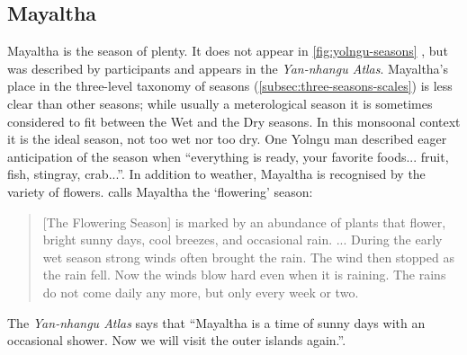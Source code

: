 \subsection{Mayaltha}


Mayaltha is the season of plenty.  It does not appear in
\cref{fig:yolngu-seasons} \citep{davis1989}, but was described by
participants and appears in the \textit{Yan-nhangu Atlas}.  Mayaltha's
place in the three-level taxonomy of seasons (\cref{subsec:three-seasons-scales})
is less clear than other seasons; while usually a meterological season
it is sometimes considered to fit between the Wet and the Dry seasons.
%
In this monsoonal context it is the ideal season, not too wet nor too dry.
One Yolngu man described eager anticipation of the season
when ``everything is ready, your favorite foods...  fruit, fish, stingray,
crab...''.  In addition to weather, Mayaltha is recognised by the variety
of flowers.
%
\citet{davis1989} calls Mayaltha the `flowering' season:
\begin{quote}
    [The Flowering Season] is marked by an abundance of plants that
    flower, bright sunny days, cool breezes, and occasional rain. ...
    During the early wet season strong winds often brought the rain.
    The wind then stopped as the rain fell.  Now the winds blow hard
    even when it is raining.  The rains do not come daily any more,
    but only every week or two.
\end{quote}

The \textit{Yan-nhangu Atlas} says that ``Mayaltha is a time of sunny days
with an occasional shower.  Now we will visit the outer islands again.''.


